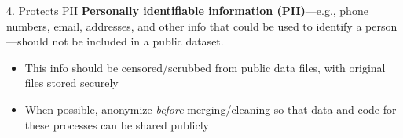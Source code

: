 \documentclass[12pt, compress]{beamer} %
\let\olditem\item %
\renewcommand{\item}{%
\olditem\vspace{\fill}}
\begin{document}
	\begin{frame}{4. Protects PII}
		 \textbf{Personally identifiable information (PII)}---e.g., phone numbers, email, addresses, and other info that could be used to identify a person---should not be included in a public dataset. 
		 
		\begin{itemize}		
			\item This info should be censored/scrubbed from public data files, with original files stored securely
			\item When possible, anonymize \textit{before} merging/cleaning so that data and code for these processes can be shared publicly
		\end{itemize} 
		\bigskip
			
	\end{frame}
 
\end{document}
